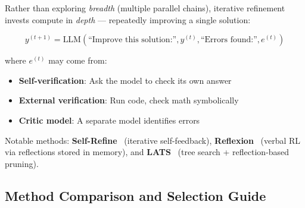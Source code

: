 Rather than exploring \emph{breadth} (multiple parallel chains), iterative refinement invests compute in \emph{depth} --- repeatedly improving a single solution:

\begin{equation}
y^{(t+1)} = \text{LLM}\!\left(\text{``Improve this solution:''}, y^{(t)}, \text{``Errors found:''}, e^{(t)}\right)
\end{equation}

where $e^{(t)}$ may come from:

\begin{itemize}
  \item \textbf{Self-verification}: Ask the model to check its own answer
  \item \textbf{External verification}: Run code, check math symbolically
  \item \textbf{Critic model}: A separate model identifies errors
\end{itemize}

Notable methods: \textbf{Self-Refine}~\cite{madaan2023selfrefine} (iterative self-feedback), \textbf{Reflexion}~\cite{shinn2023reflexion} (verbal RL via reflections stored in memory), and \textbf{LATS}~\cite{zhou2024lats} (tree search + reflection-based pruning).

\subsection{Method Comparison and Selection Guide}
\label{method-comparison-and-selection-guide}

